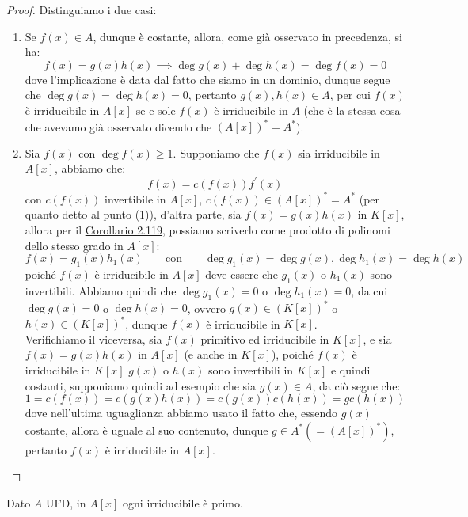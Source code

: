 \documentclass[11pt]{scrartcl}
\begin{document}
\begin{proof}
    Distinguiamo i due casi:
    \begin{enumerate}
        \item Se $f(x) \in A$, dunque è costante, allora, come già osservato in precedenza, si ha:
        \[ f(x) = g(x)h(x) \implies \deg g(x) + \deg h(x) = \deg f(x) = 0
            \]
        dove l'implicazione è data dal fatto che siamo in un dominio, dunque segue che $\deg g(x) = \deg h(x) =  0$, pertanto $g(x),h(x) \in A$,
        per cui $f(x)$ è irriducibile in $A[x]$ se e sole $f(x)$ è irriducibile in $A$ (che è la stessa cosa che avevamo già osservato dicendo che $(A[x])^* = A^*$).
        \item Sia $f(x)$ con $\deg f(x) \geq 1$. Supponiamo che $f(x)$ sia irriducibile in $A[x]$, abbiamo che:
        \[ f(x) = c(f(x))f^{\prime}(x)
            \]
        con $c(f(x))$ invertibile in $A[x]$, $c(f(x)) \in (A[x])^* = A^*$ (per quanto detto al punto (1)), d'altra parte, sia $f(x) = g(x)h(x)$ in $K[x]$, allora per il
        \hyperref[2.119]{Corollario 2.119}, possiamo scriverlo come prodotto di polinomi dello stesso grado in $A[x]$:
        \[ f(x) = g_1(x)h_1(x) \qquad \text{con} \qquad \deg g_1(x) = \deg g(x), \deg h_1(x) = \deg h(x)
            \]
        poiché $f(x)$ è irriducibile in $A[x]$ deve essere che $g_1(x)$ o $h_1(x)$ sono invertibili. Abbiamo quindi che $\deg g_1(x) = 0$ o $\deg h_1(x) = 0$, da cui
        $\deg g(x) = 0$ o $\deg h(x) = 0$, ovvero $g(x) \in (K[x])^*$ o $h(x) \in (K[x])^*$, dunque $f(x)$ è irriducibile in $K[x]$. \\
        Verifichiamo il viceversa, sia $f(x)$ primitivo ed irriducibile in $K[x]$, e sia $f(x) = g(x)h(x)$ in $A[x]$ (e anche in $K[x]$), poiché $f(x)$ è irriducibile in $K[x]$ 
        $g(x)$ o $h(x)$ sono invertibili in $K[x]$ e quindi costanti, supponiamo quindi ad esempio che sia $g(x) \in A$, da ciò segue che:
        \[ 1 = c(f(x)) = c(g(x)h(x)) = c(g(x))c(h(x)) = g c(h(x))
            \]
        dove nell'ultima uguaglianza abbiamo usato il fatto che, essendo $g(x)$ costante, allora è uguale al suo contenuto, dunque $g \in A^* (= (A[x])^*)$, pertanto $f(x)$ è irriducibile in $A[x]$.
    \end{enumerate}
\end{proof}

\begin{proposition}
    Dato $A$ UFD, in $A[x]$ ogni irriducibile è primo.
\end{proposition}
\end{document}
